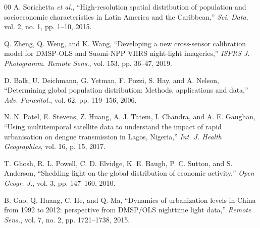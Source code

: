 \documentclass[conference]{IEEEtran}
\begin{document}
\begin{thebibliography}{00}
A. Sorichetta \textit{et al.}, ``High-resolution spatial distribution of population and socioeconomic characteristics in Latin America and the Caribbean,'' \textit{Sci. Data}, vol. 2, no. 1, pp. 1--10, 2015.

Q. Zheng, Q. Weng, and K. Wang, ``Developing a new cross-sensor calibration model for DMSP-OLS and Suomi-NPP VIIRS night-light imageries,'' \textit{ISPRS J. Photogramm. Remote Sens.}, vol. 153, pp. 36--47, 2019.

D. Balk, U. Deichmann, G. Yetman, F. Pozzi, S. Hay, and A. Nelson, ``Determining global population distribution: Methods, applications and data,'' \textit{Adv. Parasitol.}, vol. 62, pp. 119--156, 2006.

N. N. Patel, E. Stevens, Z. Huang, A. J. Tatem, I. Chandra, and A. E. Gaughan, ``Using multitemporal satellite data to understand the impact of rapid urbanisation on dengue transmission in Lagos, Nigeria,'' \textit{Int. J. Health Geographics}, vol. 16, p. 15, 2017.

T. Ghosh, R. L. Powell, C. D. Elvidge, K. E. Baugh, P. C. Sutton, and S. Anderson, ``Shedding light on the global distribution of economic activity,'' \textit{Open Geogr. J.}, vol. 3, pp. 147--160, 2010.

B. Gao, Q. Huang, C. He, and Q. Ma, ``Dynamics of urbanization levels in China from 1992 to 2012: perspective from DMSP/OLS nighttime light data,'' \textit{Remote Sens.}, vol. 7, no. 2, pp. 1721--1738, 2015.

\end{thebibliography}
\end{document}

